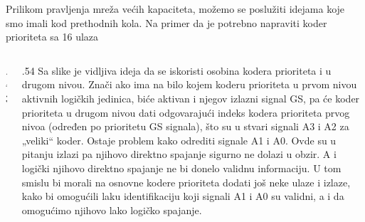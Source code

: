 \begin{frame}[label=03-s019]
\gusttekst
Prilikom pravljenja mreža većih kapaciteta, možemo se poslužiti idejama koje smo imali kod prethodnih kola. Na primer da je potrebno napraviti koder prioriteta sa 16 ulaza
\begin{columns}[c,onlytextwidth]
\begin{column}{.43\textwidth}\centering

\end{column}
\begin{column}{.54\textwidth}
Sa slike je vidljiva ideja da se iskoristi osobina kodera prioriteta i u drugom nivou. Znači ako ima na bilo kojem koderu prioriteta u prvom nivou aktivnih logičkih jedinica, biće aktivan i njegov izlazni signal GS, pa će koder prioriteta u drugom nivou dati odgovarajući indeks kodera prioriteta prvog nivoa (određen po prioritetu GS signala), što su u stvari signali A3 i A2 za „veliki“ koder. Ostaje problem kako odrediti signale A1 i A0. \alert{Ovde su u pitanju izlazi pa njihovo direktno spajanje sigurno ne dolazi u obzir.} A i logički njihovo direktno spajanje ne bi donelo validnu informaciju. U tom smislu bi morali na osnovne kodere prioriteta dodati još neke ulaze i izlaze, kako bi omogućili laku identifikaciju koji signali A1 i A0 su validni, a i da omogućimo njihovo lako logičko spajanje.
\end{column}
\end{columns}
\end{frame}
